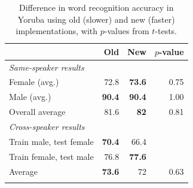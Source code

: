 \documentclass[11pt]{article}
\begin{document}
\begin{table}
\begin{center}
\begin{tabularx}{\columnwidth}{X r r r}
\hline
 & Old & New & $p$-value\\
\hline
\addlinespace
\textit{Same-speaker results} & & & \\
\addlinespace
Female  (avg.) & 72.8 & \textbf{73.6} & 0.75 \\
Male  (avg.) & \textbf{90.4} & \textbf{90.4} & 1.00\\
Overall average & 81.6 & \textbf{82} & 0.81 \\
\addlinespace
\hline
\addlinespace
 \textit{Cross-speaker results} &  &  & \\
 \addlinespace
 Train male, test female & \textbf{70.4} & 66.4 &\\
Train female, test male & 76.8 & \textbf{77.6} &\\
 Average & \textbf{73.6} & 72 & 0.63\\
 \addlinespace
\hline
\end{tabularx}
\end{center}
\caption{Difference in word recognition accuracy in Yoruba 
using old (slower) and new (faster) implementations, with $p$-values from 
$t$-tests. \label{tab:accuracy}}
\end{table}
\end{document}
